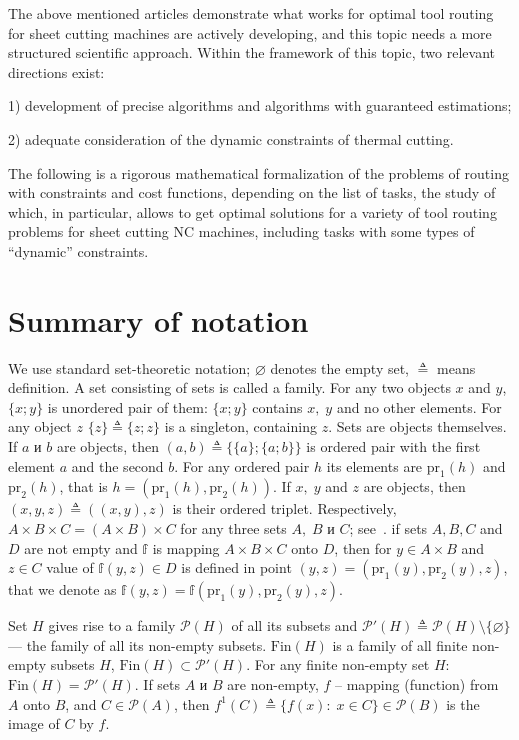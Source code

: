 \documentclass[10pt]{article}
\begin{document}
The above mentioned articles demonstrate
what works for optimal tool routing for
sheet cutting machines are actively developing,
and this topic needs a more structured scientific approach.
Within the framework of this topic, two relevant
directions exist:

1) development of precise algorithms and algorithms with
guaranteed estimations;

2) adequate consideration of the dynamic constraints of thermal cutting.

The following is a rigorous mathematical formalization
of the
problems of routing
with constraints and cost functions,
depending on the list of tasks,
the study of which, in particular,
allows to get optimal solutions for a variety of
tool routing problems
for sheet cutting NC machines,
including tasks with some types of
``dynamic'' constraints.

\section{Summary of notation}
\label{sec:1}

We use standard set-theoretic notation;
$\varnothing$ denotes the empty set,
${\triangleq}$ means definition.
A set consisting of sets
is called a family.
For any two objects $x$
and $y$,
$\{x;y\}$
is unordered pair of them:
$\{x;y\}$ contains $x,\;y$
and no other elements.
For any object $z$
$\{z\} {\triangleq} \{z;z\}$
is a singleton, containing
$z$.
Sets are objects themselves.
If $a$ и $b$ are objects, then
\cite[~67]{15}
$(a,b) {\triangleq} \{\{a\};\{a;b\}\}$
is ordered pair with
the first element $a$
and the second $b$.
For any ordered pair $h$
its elements are
$\mathrm{pr}_1(h)$
and
$\mathrm{pr}_2(h)$,
that is
$h = (\mathrm{pr} _1(h),\mathrm{pr} _2(h))$.
If $x,\;y$ and $z$ are objects,
then
$(x,y,z) {\triangleq} ((x,y),z)$
is their ordered triplet.
Respectively,
$A \times B \times C = (A \times B) \times C$
for any three sets
$A,\;B$ и $C$;
see~\cite[17]{16}.
if sets
$A, B, C$
and
$D$
are not empty and
$\mathbb{f}$
is mapping
$A\times B\times C$ onto $D$,
then for
$y \in A\times B$
and
$z \in C$
value of
$\mathbb f(y,z)\in D$
is defined in point
$(y,z) = (\mathrm{pr}_1(y), \mathrm{pr}_2(y), z)$,
that we denote as
$\mathbb f(y,z) = \mathbb f(\mathrm{pr}_1(y), \mathrm{pr}_2(y), z)$.

Set $H$
gives rise to a family $\mathcal{P}(H)$
of all its subsets
and $\mathcal{P}'(H) {\triangleq}
\mathcal{P}(H) \setminus \{\varnothing\}$
--- the family of all its non-empty subsets.
$\mathrm{Fin}(H)$
is a family of all finite
non-empty subsets
$H$,
$\mathrm{Fin}(H) \subset \mathcal{P}'(H)$.
For any finite non-empty set
$H$:
$\mathrm{Fin}(H) = \mathcal{P}'(H)$.
If sets $A$ и $B$ are non-empty,
$f$ -- mapping (function) from $A$ onto $B$,
and $C \in \mathcal{P}(A)$,
then
$f^1(C) {\triangleq} \{f(x):\;x \in C\} \in \mathcal{P}(B)$
is the image of $C$ by $f$.
\end{document}
